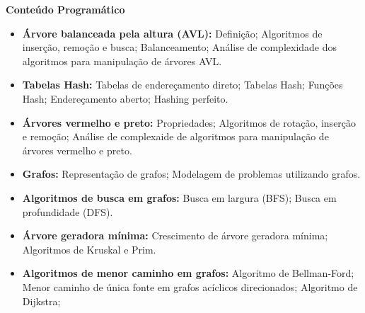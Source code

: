 
\begin{snugshade}\begin{center}\textbf{
    Conteúdo Programático
}\end{center}\end{snugshade}

\begin{itemize}

 \item \textbf{\'Arvore balanceada pela altura (AVL):} Defini\c{c}\~ao; Algoritmos de inser\c{c}\~ao, remo\c{c}\~ao e busca; Balanceamento; An\'alise de complexidade dos algoritmos para manipula\c{c}\~ao de \'arvores AVL.


 \item \textbf{Tabelas Hash:} Tabelas de endere\c{c}amento direto; Tabelas Hash; Fun\c{c}\~oes Hash; Endere\c{c}amento aberto; Hashing perfeito.

 \item \textbf{\'Arvores vermelho e preto:} Propriedades; Algoritmos de rota\c{c}\~ao, inser\c{c}\~ao e remo\c{c}\~ao; An\'alise de complexaide de algoritmos para manipula\c{c}\~ao de \'arvores vermelho e preto.

 \item \textbf{Grafos:} Representa\c{c}\~ao de grafos; Modelagem de problemas utilizando grafos.

 \item \textbf{Algoritmos de busca em grafos:} Busca em largura (BFS); Busca em profundidade (DFS).

 \item \textbf{\'Arvore geradora m\'inima:} Crescimento de \'arvore geradora m\'inima; Algoritmos de Kruskal e Prim.

 \item \textbf{Algoritmos de menor caminho em grafos:} Algoritmo de Bellman-Ford; Menor caminho de \'unica fonte em grafos ac\'iclicos direcionados; Algoritmo de Dijkstra; 

\end{itemize}






